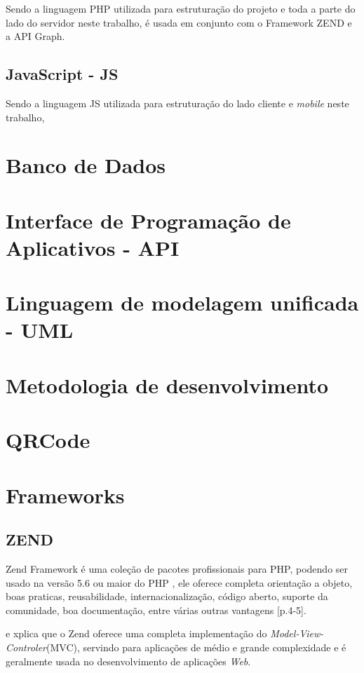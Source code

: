 Sendo a linguagem PHP utilizada para estruturação do projeto e toda a parte do lado do servidor neste trabalho, é usada em conjunto com o Framework ZEND e a API Graph. 

\subsection{JavaScript - JS}
Sendo a linguagem JS utilizada para estruturação do lado cliente e \textit{mobile} neste trabalho,

\section{Banco de Dados}

\section{Interface de Programação de Aplicativos - API}

\section{Linguagem de modelagem unificada - UML}

\section{Metodologia de desenvolvimento}

\section{QRCode}

\section{Frameworks}
\subsection{ZEND}
Zend Framework é uma coleção de pacotes profissionais para PHP, podendo ser usado na versão 5.6 ou maior do PHP \cite{zend2018}, ele oferece completa orientação a objeto, boas praticas, reusabilidade, internacionalização, código aberto, suporte da comunidade, boa documentação, entre várias outras vantagens \cite{vaswani2010}[p.4-5].

\cite[p.3]{vaswani2010} e xplica que o Zend oferece uma completa implementação do \textit{Model-View-Controler}(MVC), servindo para aplicações de médio e grande complexidade e é geralmente usada no desenvolvimento de aplicações \textit{Web}.


